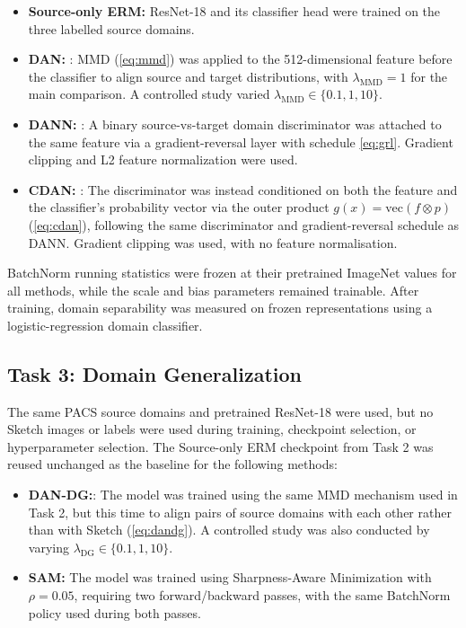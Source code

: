 \documentclass{article}
\begin{document}
\begin{itemize}
    \item \textbf{Source-only ERM:} ResNet-18 and its classifier head were trained on the three labelled source domains.
    \item \textbf{DAN:} \citep{long2015learning}: MMD (\eqref{eq:mmd}) was applied to the 512-dimensional feature before the classifier to align source and target distributions, with $\lambda_{\text{MMD}} = 1$ for the main comparison. A controlled study varied $\lambda_{\text{MMD}} \in \{0.1, 1, 10\}$.
    \item \textbf{DANN:} \citep{ganin2016domain}: A binary source-vs-target domain discriminator was attached to the same feature via a gradient-reversal layer with schedule \eqref{eq:grl}. Gradient clipping and L2 feature normalization were used.
    \item \textbf{CDAN:} \citep{long2018conditional}: The discriminator was instead conditioned on both the feature and the classifier's probability vector via the outer product $g(x) = \text{vec}(f \otimes p)$ (\eqref{eq:cdan}), following the same discriminator and gradient-reversal schedule as DANN. Gradient clipping was used, with no feature normalisation.
\end{itemize}
 
BatchNorm running statistics were frozen at their pretrained ImageNet values for all methods, while the scale and bias parameters remained trainable. After training, domain separability was measured on frozen representations using a logistic-regression domain classifier.
 
\subsection{Task 3: Domain Generalization}
\label{subsec:methods-task3}
 
The same PACS source domains and pretrained ResNet-18 were used, but no Sketch images or labels were used during training, checkpoint selection, or hyperparameter selection. The Source-only ERM checkpoint from Task 2 was reused unchanged as the baseline for the following methods:
 
\begin{itemize}
    \item \textbf{DAN-DG:}\citep{long2015learning}: The model was trained using the same MMD mechanism used in Task 2, but this time to align pairs of source domains with each other rather than with Sketch (\eqref{eq:dandg}). A controlled study was also conducted by varying $\lambda_{\text{DG}} \in \{0.1, 1, 10\}$.
    \item \textbf{SAM:} The model was trained using Sharpness-Aware Minimization \citep{foret2021sharpness} with $\rho = 0.05$, requiring two forward/backward passes, with the same BatchNorm policy used during both passes.
\end{itemize}
 
\end{document}
